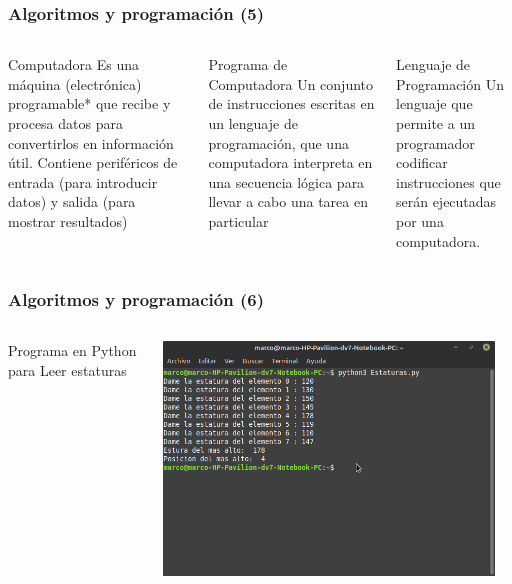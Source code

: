 \begin{frame}
\frametitle{Algoritmos y programaci\'on (5)}
\begin{columns}

\begin{block}{Computadora}
Es una m\'aquina (electr\'onica) programable* que recibe y procesa datos para convertirlos en informaci\'on \'util. Contiene perif\'ericos de entrada (para introducir datos) y salida (para mostrar resultados) \pause
\end{block}


\begin{block}{Programa de Computadora}
Un conjunto de instrucciones escritas en un lenguaje de programaci\'on, que una computadora interpreta en una secuencia l\'ogica para llevar a cabo una tarea en particular \pause
\end{block}




\begin{block}{Lenguaje de Programaci\'on}
Un lenguaje que permite a un programador codificar instrucciones que ser\'an ejecutadas por una computadora. \pause
\end{block}

\end{columns}
\end{frame}


\begin{frame}[fragile]
\frametitle{Algoritmos y programaci\'on (6)}

\begin{columns}

\begin{block}{Programa en Python para Leer estaturas}
\inputminted[linenos,fontsize=\tiny]{python}{00_ConceptoAlgoritmo_Ninos/Estaturas.py}
\end{block}


\begin{center}

\includegraphics[width=0.95\textwidth]{00_ConceptoAlgoritmo_Ninos/Ejecucion_Estaturas.png} \pause
\end{center} 

\end{columns}
\end{frame}



